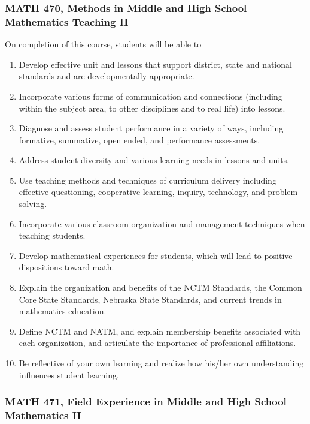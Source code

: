 \documentclass[11pt]{article}
\newenvironment{alphalist}{
\begin{enumerate}[label=(\arabic*),widest=107 ,leftmargin=25pt, itemsep=0pt]}
{\end{enumerate}}
\begin{document}
\subsubsection{MATH 470, Methods in Middle and High School Mathematics Teaching II}

On completion of this course, students will be able to
\begin{alphalist}
\item Develop effective unit and lessons that support district, state and national standards and are developmentally appropriate.
\item Incorporate various forms of communication and connections (including within the subject area, to other disciplines and to real life) into lessons.
\item Diagnose and assess student performance in a variety of ways, including formative, summative, open ended, and performance assessments.
\item Address student diversity and various learning needs in lessons and units.
\item Use teaching methods and techniques of curriculum delivery including effective questioning, cooperative learning, inquiry, technology, and problem solving.
\item Incorporate various classroom organization and management techniques when teaching students.
\item Develop mathematical experiences for students, which will lead to positive dispositions toward math.
 \item Explain the organization and benefits of the NCTM Standards, the Common Core State Standards, Nebraska State Standards, and current trends in mathematics education.
\item Define NCTM and NATM, and explain membership benefits associated with each organization, and articulate the importance of professional affiliations.
\item Be reflective of your own learning and realize how his/her own understanding influences student learning.
\end{alphalist}

\subsubsection{MATH 471, Field Experience in Middle and High School Mathematics II}
\end{document}
